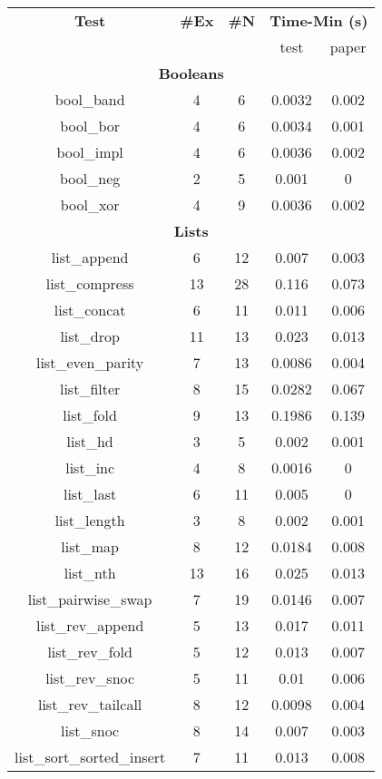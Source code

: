 \documentclass[preprint, 11pt]{sigplanconf}
\begin{document}
\begin{figure}[!ht]
  \begin{center}
  \footnotesize
  \begin{tabular}{ccccc}
  \hline
  \textbf{Test} & \textbf{ \#Ex } & \textbf{ \#N } & \multicolumn{2}{c}{\textbf{Time-Min (s)}} \\
   &  &  & test & paper \\
  \hline
\multicolumn{5}{c}{\textbf{Booleans}} \\
bool\_band & 4 & 6 & 0.0032 & 0.002 \\
bool\_bor & 4 & 6 & 0.0034 & 0.001 \\
bool\_impl & 4 & 6 & 0.0036 & 0.002 \\
bool\_neg & 2 & 5 & 0.001 & 0 \\
bool\_xor & 4 & 9 & 0.0036 & 0.002 \\
  \hline
\multicolumn{5}{c}{\textbf{Lists}} \\
list\_append & 6 & 12 & 0.007 & 0.003 \\
list\_compress & 13 & 28 & 0.116 & 0.073 \\
list\_concat & 6 & 11 & 0.011 & 0.006 \\
list\_drop & 11 & 13 & 0.023 & 0.013 \\
list\_even\_parity & 7 & 13 & 0.0086 & 0.004 \\
list\_filter & 8 & 15 & 0.0282 & 0.067 \\
list\_fold & 9 & 13 & 0.1986 & 0.139 \\
list\_hd & 3 & 5 & 0.002 & 0.001 \\
list\_inc & 4 & 8 & 0.0016 & 0 \\
list\_last & 6 & 11 & 0.005 & 0 \\
list\_length & 3 & 8 & 0.002 & 0.001 \\
list\_map & 8 & 12 & 0.0184 & 0.008 \\
list\_nth & 13 & 16 & 0.025 & 0.013 \\
list\_pairwise\_swap & 7 & 19 & 0.0146 & 0.007 \\
list\_rev\_append & 5 & 13 & 0.017 & 0.011 \\
list\_rev\_fold & 5 & 12 & 0.013 & 0.007 \\
list\_rev\_snoc & 5 & 11 & 0.01 & 0.006 \\
list\_rev\_tailcall & 8 & 12 & 0.0098 & 0.004 \\
list\_snoc & 8 & 14 & 0.007 & 0.003 \\
list\_sort\_sorted\_insert & 7 & 11 & 0.013 & 0.008 \\

\end{tabular}
\end{center}
\end{figure}
\end{document}
